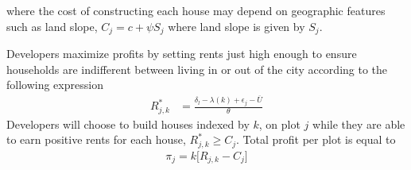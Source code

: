 \documentclass[12pt]{article}
\begin{document}


\noindent where the cost of constructing each house may depend on geographic features such as land slope, $C_{j} = c + \psi S_{j}$ where land slope is given by $S_{j}$.

Developers maximize profits by setting rents just high enough to ensure households are indifferent between living in or out of the city according to the following expression
\begin{align*}
R_{j,k}^{*} &= \frac{ \delta_{l} - \lambda(k) + \epsilon_j - \overline{U}}{\theta}
\end{align*}
Developers will choose to build houses indexed by $k$, on plot $j$ while they are able to earn positive rents for each house, $R^{*}_{j,k}\geq C_j$.  Total profit per plot is equal to 
\begin{align*}
\pi_{j} = k \Big[R_{j,k} - C_{j} \Big]
\end{align*}
\end{document}
